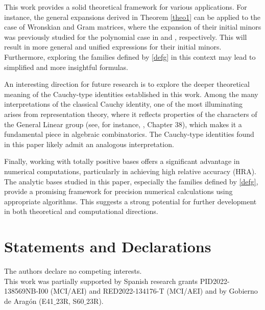\documentclass[smallextended]{svjour3}       %
\begin{document}
This work provides a solid theoretical framework for various applications. 
For instance, the general expansions derived in Theorem \ref{theo1} can be applied to the case of Wronskian and Gram matrices, where the expansion of their initial minors was previously studied for the
polynomial case in   \cite{DMR2} and \cite{DMR3}, respectively. This will result in more general and unified expressions
for their initial minors. 
Furthermore, exploring the families defined by \eqref{defg} in this context
may lead to simplified and more insightful formulas.
 
An interesting direction for future research is to explore the deeper theoretical meaning
of the Cauchy-type identities established in this work.   Among the many interpretations of the classical Cauchy identity, one of the most illuminating arises from representation theory, where it reflects properties of the characters of the General Linear group (see, for instance,
  \cite{Bump}, Chapter
38), which makes it a fundamental piece in algebraic combinatorics. The Cauchy-type identities found in this paper likely admit an analogous interpretation. 

Finally, working with totally positive bases offers a significant advantage in numerical
computations, particularly in achieving high relative accuracy (HRA). The analytic bases
studied in this paper, especially the families defined by \eqref{defg}, provide a promising framework
for precision numerical calculations using appropriate algorithms. This suggests a strong
potential for further development in both theoretical and computational directions. 


 
\bigskip



\section*{Statements and Declarations}

 The authors declare no competing interests.\\
 
 This work was partially supported by Spanish research grants PID2022-138569NB-I00 (MCI/AEI) and RED2022-134176-T (MCI/AEI) and by Gobierno de Aragón (E41$\_$23R, S60$\_$23R). \\
\end{document}
